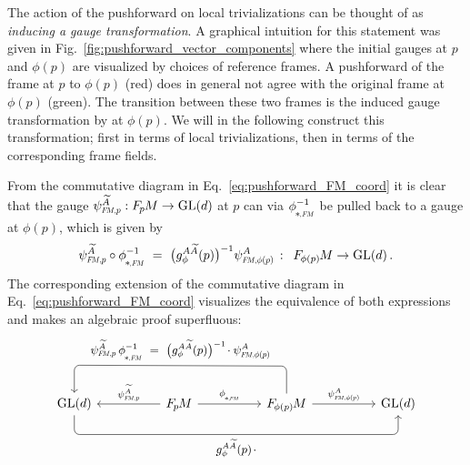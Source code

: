 The action of the pushforward on local trivializations can be thought of as \emph{inducing a gauge transformation}.
A graphical intuition for this statement was given in Fig.~\ref{fig:pushforward_vector_components} where the initial gauges at $p$ and $\phi(p)$ are visualized by choices of reference frames.
A pushforward of the frame at $p$ to $\phi(p)$ (red) does in general not agree with the original frame at $\phi(p)$ (green).
The transition between these two frames is the induced gauge transformation by at $\phi(p)$.
We will in the following construct this transformation; first in terms of local trivializations, then in terms of the corresponding frame fields.


From the commutative diagram in Eq.~\eqref{eq:pushforward_FM_coord} it is clear that the gauge $\psiFMp^{\widetilde{A}}: \FpM \to \GL{d}$ at $p$ can via $\dphiFM^{-1}$ be pulled back to a gauge at $\phi(p)$, which is given by
\begin{align}\label{eq:isom_pullback_section_FM}
    \psiFMp^{\widetilde{A}} \circ \dphiFM^{-1}
    \ =\ \big( g_\phi^{A\widetilde{A}}(p) \big)^{-1} \psiFMphip^A
    \,:\,\ \FphipM \to \GL{d} \,.
\end{align}
The corresponding extension of the commutative diagram in Eq.~\eqref{eq:pushforward_FM_coord} visualizes the equivalence of both expressions and makes an algebraic proof superfluous:
\begin{equation}\label{cd:pushforward_FM_coord_extended}
    \begin{tikzcd}[row sep=4.em, column sep=5em]
        \GL{d}
            \arrow[rrr, pos=.5, rounded corners, to path={ 
                    -- ([yshift=-3.5ex]\tikztostart.south) 
                    --node[below]{\small$
                        g_\phi^{A\widetilde{A}}(p) \mkern2mu\cdot
                        $} ([yshift=-3.5ex]\tikztotarget.south) 
                    -- (\tikztotarget.south)
                    }]
        &
        \FpM
            \arrow[l, "\psiFMp^{\widetilde{A}}"']
            \arrow[r, "\dphiFM"]
        &
        \FphipM
            \arrow[r, "\psiFMphip^A"]
            \arrow[ll, pos=.5, rounded corners, to path={ 
                    -- ([yshift=5.ex]\tikztostart.north) 
                    --node[above]{\small$
                        \psiFMp^{\widetilde{A}}\, \dphiFM^{-1}\ =\ 
                        \big( g_\phi^{A\widetilde{A}}(p) \big)^{-1} \mkern-2mu\cdot \psiFMphip^A
                        $} ([yshift=5.ex]\tikztotarget.north) 
                    -- (\tikztotarget.north)
                    }]
        &
        \GL{d}
    \end{tikzcd}
\end{equation}
